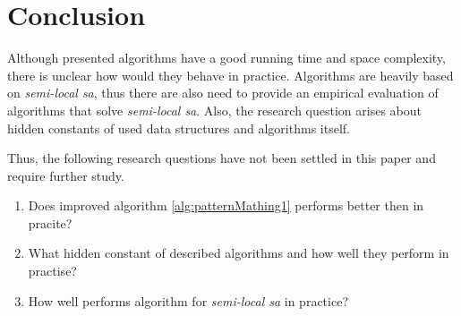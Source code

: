 \section{Conclusion}
\label{section:conclusion}

Although presented algorithms have a good running time and space complexity, there is unclear how would they behave in practice.
Algorithms are heavily based on \emph{semi-local sa}, thus
there are also need to provide an empirical evaluation of 
algorithms that solve \emph{semi-local sa}.
Also, the research question arises about hidden constants of used data structures and algorithms itself.  

Thus, the following research questions have not been settled in this paper and require further study.
\begin{enumerate}
\item Does improved algorithm \ref{alg:patternMathing1} performs better then \cite{luciv2019interactive}  in pracite?
\item What hidden constant of described algorithms and how well they perform in practise?
\item How well performs algorithm for \emph{semi-local sa} in practice?
\end{enumerate} 